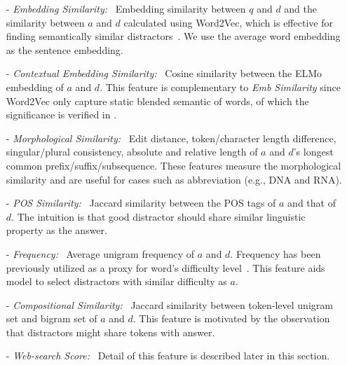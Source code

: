 \begin{itemize}
	\item[-] \textit{Embedding Similarity:} ~Embedding similarity between $q$ and $d$ and the similarity between $a$ and $d$ calculated using Word2Vec, which is effective for finding semantically similar distractors~\cite{guo2016questimator}. We use the average word embedding as the sentence embedding. 
	\item[-] \textit{Contextual Embedding Similarity:} ~Cosine similarity between the ELMo~\cite{peters2018deep} embedding of $a$ and $d$. This feature is complementary to \textit{Emb Similarity} since Word2Vec only capture static blended semantic of words, of which the significance is verified in .
	\item[-] \textit{Morphological Similarity:} ~Edit distance, token/character length difference, singular/plural consistency, absolute and relative length of $a$ and $d$'s longest common prefix/suffix/subsequence. These features measure the morphological similarity and are useful for cases such as abbreviation 
(e.g., DNA and RNA). 
	\item[-] \textit{POS Similarity:} ~Jaccard similarity between the 
POS tags of $a$ and that of $d$. The intuition is that good distractor 
should share similar linguistic property as the answer.
	\item[-] \textit{Frequency:} ~Average unigram frequency of $a$ and $d$. Frequency has been previously utilized as a proxy for word's difficulty level~\cite{article}. This feature aids model to select distractors with similar difficulty as $a$.
	\item[-] \textit{Compositional Similarity:} ~Jaccard similarity between token-level
unigram set and bigram set of $a$ and $d$. This feature is motivated 
by the observation that distractors might share tokens with answer.
	\item[-] \textit{Web-search Score:} ~Detail of this feature is described later in this section.
\end{itemize} 

